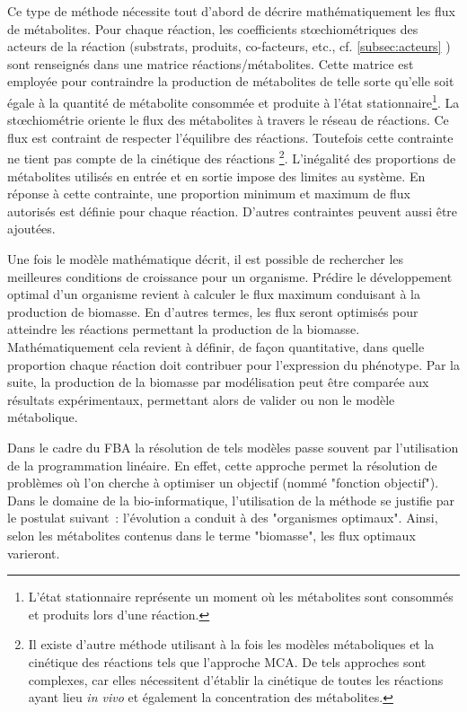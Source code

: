 \begin{refsegment}
    Ce type de méthode nécessite tout d’abord de décrire mathématiquement les flux de métabolites. Pour chaque réaction, les coefficients stœchiométriques des acteurs de la réaction (substrats, produits, co-facteurs, etc., cf. \cref{subsec:acteurs} ) sont renseignés dans une matrice réactions/métabolites. Cette matrice est employée pour contraindre la production de métabolites de telle sorte qu’elle soit égale à la quantité de métabolite consommée et produite à l’état stationnaire\footnote{L'état stationnaire représente un moment où les métabolites sont consommés et produits lors d'une réaction.}. La stœchiométrie oriente le flux des métabolites à travers le réseau de réactions. Ce flux est contraint de respecter l’équilibre des réactions. Toutefois cette contrainte ne tient pas compte de la cinétique des réactions \cite{covert2001metabolic,edwards2002metabolic}\footnote{Il existe d'autre méthode utilisant à la fois les modèles métaboliques et la cinétique des réactions tels que l'approche \gls{MCA}. De tels approches sont complexes, car elles nécessitent d'établir la cinétique de toutes les réactions ayant lieu \textit{in vivo} et également la concentration des métabolites.}. L’inégalité des proportions de métabolites utilisés en entrée et en sortie impose des limites au système. En réponse à cette contrainte, une proportion minimum et maximum de flux autorisés est définie pour chaque réaction. D’autres contraintes peuvent aussi être ajoutées.
    
    Une fois le modèle mathématique décrit, il est possible de rechercher les meilleures conditions de croissance pour un organisme. Prédire le développement optimal d’un organisme revient à calculer le flux maximum conduisant à la production de biomasse. En d’autres termes, les flux seront optimisés pour atteindre les réactions permettant la production de la biomasse. Mathématiquement cela revient à définir, de façon quantitative, dans quelle proportion chaque réaction doit contribuer pour l’expression du phénotype. Par la suite, la production de la biomasse par modélisation peut être comparée aux résultats expérimentaux, permettant alors de valider ou non le modèle métabolique.
    
    
    Dans le cadre du \gls{FBA} la résolution de tels modèles passe souvent par l’utilisation de la programmation linéaire. En effet, cette approche permet la résolution de problèmes où l’on cherche à optimiser un objectif (nommé "fonction objectif"). Dans le domaine de la bio-informatique, l’utilisation de la méthode se justifie par le postulat suivant : l’évolution a conduit à des "organismes optimaux". Ainsi, selon les métabolites contenus dans le terme "biomasse", les flux optimaux varieront.
    

\end{refsegment}
